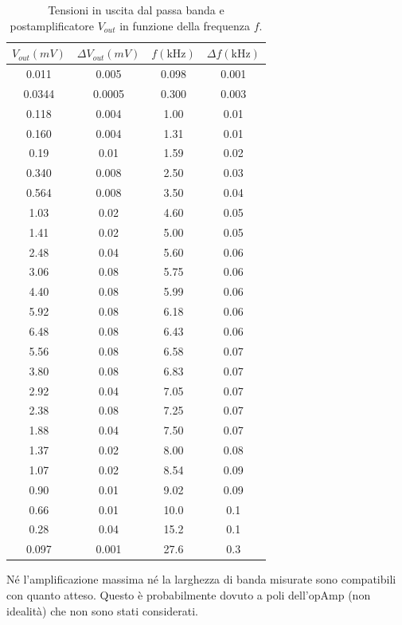 \documentclass[10pt,a4paper]{article}
\begin{document}
\begin{table}[!htb]\centering
\begin{tabular}{|c|c|c|c|}
\hline
$V_{out} (mV)$ & $\Delta V_{out} (mV)$ & $f (\mbox{kHz})$ & $\Delta f (\mbox{kHz})$\\ 
\hline
0.011 & 0.005 & 0.098 & 0.001\\
0.0344 & 0.0005 & 0.300 & 0.003\\
0.118 & 0.004 & 1.00 & 0.01\\
0.160 & 0.004 & 1.31 & 0.01\\
0.19 & 0.01 & 1.59 & 0.02\\
0.340 & 0.008 & 2.50 & 0.03\\
0.564 & 0.008 & 3.50 & 0.04\\
1.03 & 0.02 & 4.60 & 0.05\\
1.41 & 0.02 & 5.00 & 0.05\\
2.48 & 0.04 & 5.60 & 0.06\\
3.06 & 0.08 & 5.75 & 0.06\\
4.40 & 0.08 & 5.99 & 0.06\\
5.92 & 0.08 & 6.18 & 0.06\\
6.48 & 0.08 & 6.43 & 0.06\\
5.56 & 0.08 & 6.58 & 0.07\\
3.80 & 0.08 & 6.83 & 0.07\\
2.92 & 0.04 & 7.05 & 0.07\\
2.38 & 0.08 & 7.25 & 0.07\\
1.88 & 0.04 & 7.50 & 0.07\\
1.37 & 0.02 & 8.00 & 0.08\\
1.07 & 0.02 & 8.54 & 0.09\\
0.90 & 0.01 & 9.02 & 0.09\\
0.66 & 0.01 & 10.0 & 0.1\\
0.28 & 0.04 & 15.2 & 0.1\\
0.097 & 0.001 & 27.6 & 0.3\\
\hline
\end{tabular}
\caption{Tensioni in uscita dal passa banda e postamplificatore $V_{out}$ in funzione della frequenza $f$.}
\label{tabellaBode2}
\end{table}


Né l'amplificazione massima né la larghezza di banda misurate sono compatibili con quanto atteso. Questo è probabilmente dovuto a poli dell'opAmp (non idealità) che non sono stati considerati.
\end{document}
